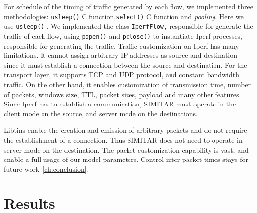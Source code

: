 For schedule of the timing of traffic generated by each flow, we implemented three methodologies: \texttt{usleep()} C function,\texttt{select()} C function and \textit{pooling}. Here we use \texttt{usleep()} . We implemented the class \texttt{IperfFlow,} responsible for generate the traffic of each flow, using \texttt{popen()} and \texttt{pclose()} to instantiate Iperf processes, responsible for generating the traffic. Traffic customization on Iperf has many limitations. It cannot assign arbitrary IP addresses as source and destination since it must establish a connection between the source and destination. For the transport layer, it supports TCP and UDP protocol, and constant bandwidth traffic. On the other hand, it enables customization of transmission time, number of packets, windows size, TTL, packet sizes, payload and many other features. Since Iperf has to establish a communication, SIMITAR must operate in the client mode on the source, and server mode on the destinations.

Libtins enable the creation and emission of arbitrary packets and do not require the establishment of a connection.  Thus SIMITAR does not need to operate in server mode on the destination. The packet customization capability is vast, and enable a full usage of our model parameters. Control inter-packet times stays for future work~\ref{ch:conclusion}. 





\section{Results}


